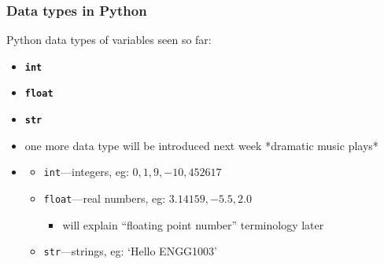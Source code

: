\documentclass[14pt]{beamer}
\begin{document}
\begin{frame}[fragile]

\frametitle{Data types in Python}

Python data types of variables seen so far:

	\begin{itemize}
		\item \textbf{\texttt{int}}
		\item \textbf{\texttt{float}}
		\item \textbf{\texttt{str}}
		\item one more data type will be introduced next week *dramatic music plays*
	\end{itemize}
	
\begin{itemize}
\item[]
	\begin{itemize}
		\item \texttt{int}---integers, eg: $0,1,9,-10,452617$
		\item \texttt{float}---real numbers, eg: $3.14159, -5.5, 2.0$
			\begin{itemize}
				\item will explain ``floating point number'' terminology later
			\end{itemize}
		\item \texttt{str}---strings, eg: `Hello ENGG1003'
	\end{itemize}
\end{itemize}

\end{frame}

\end{document}
